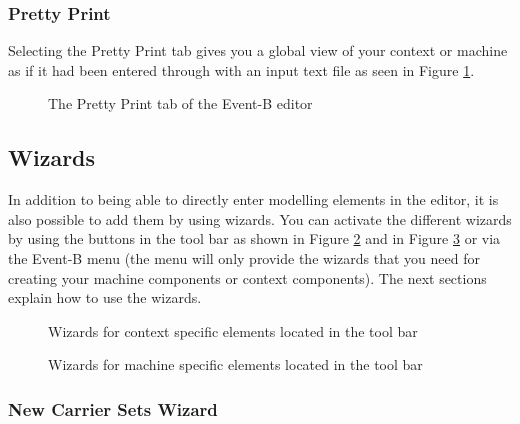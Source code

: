 \subsubsection{Pretty Print}

Selecting the \textsf{Pretty Print} tab gives you a global view of your context or machine as if it had been entered through with an input text file as seen in Figure \ref{fig_ref_01_eventb_editor10}.

\begin{figure}[!ht]
\begin{center}
	\caption{The Pretty Print tab of the Event-B editor}
	\label{fig_ref_01_eventb_editor10}
\end{center}
\end{figure}


\subsection{Wizards}
\label{eventb_wizards}
In addition to being able to directly enter modelling elements in the editor, it is also possible to add them by using wizards.
You can activate the different wizards by using the buttons in the tool bar as shown in Figure \ref{fig_ref_01_eventb_editor12} and in Figure \ref{fig_ref_01_eventb_editor13} or via the Event-B menu (the menu will only provide the wizards that you need for creating your machine components or context components). The next sections explain how to use the wizards.

\begin{figure}[!ht]
\begin{center}
	\caption{Wizards for context specific elements located in the tool bar}
	\label{fig_ref_01_eventb_editor12}
\end{center}
\end{figure}

\begin{figure}[!ht]
\begin{center}
	\caption{Wizards for machine specific elements located in the tool bar}
	\label{fig_ref_01_eventb_editor13}
\end{center}
\end{figure}


\subsubsection{New Carrier Sets Wizard}

